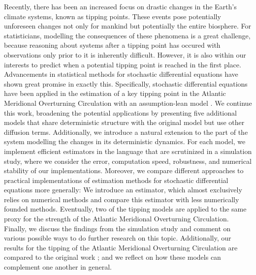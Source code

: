 \noindent Recently, there has been an increased focus on drastic changes in the Earth's climate systems, known as tipping points. These events pose potentially unforeseen changes not only for mankind but potentially the entire biosphere. For statisticians, modelling the consequences of these phenomena is a great challenge, because reasoning about systems after a tipping point has occured with observations only prior to it is inherently difficult. However, it is also within our interests to predict when a potential tipping point is reached in the first place. Advancements in statistical methods for stochastic differential equations \cite{SplittingSchemes} have shown great promise in exactly this. Specifically, stochastic differential equations have been applied in the estimation of a key tipping point in the Atlantic Meridional Overturning Circulation with an assumption-lean model \cite{Ditlevsen2023}. We continue this work, broadening the potential applications by presenting five additional models that share deterministic structure with the original model but use other diffusion terms. Additionally, we introduce a natural extension to the part of the system modelling the changes in its deterministic dynamics. For each model, we implement efficient estimators in the  language\cite{Rlang} that are scrutinized in a simulation study, where we consider the error, computation speed, robustness, and numerical stability of our implementations. Moreover, we compare different approaches to practical implementations of estimation methods for stochastic differential equations more generally: We introduce an estimator, which almost exclusively relies on numerical methods and compare this estimator with less numerically founded methods. Eventually, two of the tipping models are applied to the same proxy for the strength of the Atlantic Meridional Overturning Circulation. Finally, we discuss the findings from the simulation study and comment on various possible ways to do further research on this topic. Additionally, our results for the tipping of the Atlantic Meridional Overturning Circulation are compared to the original work \cite{Ditlevsen2023}; and we reflect on how these models can complement one another in general.